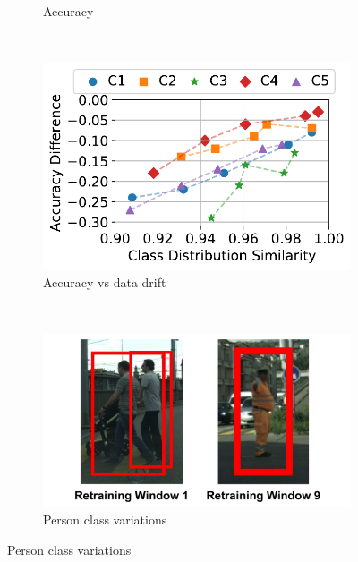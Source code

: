 \begin{figure}[t!]
\begin{subfigure}[t]{0.48\linewidth}
    
    \caption{\small Accuracy}
    \label{fig:jena-motivation}
  \end{subfigure}
    \hspace*{\fill}
  ~~
  \begin{subfigure}[t]{0.46\linewidth}
    \centering
    \includegraphics[width=\linewidth]{ekya/figures/motivation/incr_learn_motivation/motivation_datadrift_vs_acc.pdf}
     \caption{\small Accuracy vs data drift}
    \label{fig:acc-datadrift}
  \end{subfigure}
  ~~
  \begin{subfigure}[t]{0.46\linewidth}
    \centering
    \includegraphics[width=\linewidth]{ekya/figures/motivation/incr_learn_motivation/person_classshift.pdf}
    \caption{\small Person class variations}
    \label{fig:personclass}
  \end{subfigure}
  

\end{figure}
